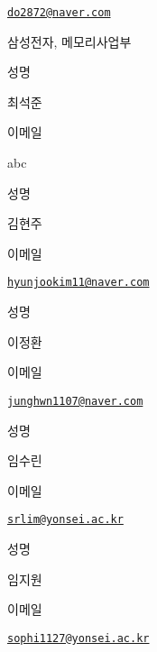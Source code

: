 \documentclass[]{book}
\begin{document}
\href{mailto:do2872@naver.com}{\nolinkurl{do2872@naver.com}}

삼성전자, 메모리사업부

성명

최석준

이메일

abc

성명

김현주

이메일

\href{mailto:hyunjookim11@naver.com}{\nolinkurl{hyunjookim11@naver.com}}

성명

이정환

이메일

\href{mailto:junghwn1107@naver.com}{\nolinkurl{junghwn1107@naver.com}}

성명

임수린

이메일

\href{mailto:srlim@yonsei.ac.kr}{\nolinkurl{srlim@yonsei.ac.kr}}

성명

임지원

이메일

\href{mailto:sophi1127@yonsei.ac.kr}{\nolinkurl{sophi1127@yonsei.ac.kr}}


\end{document}

